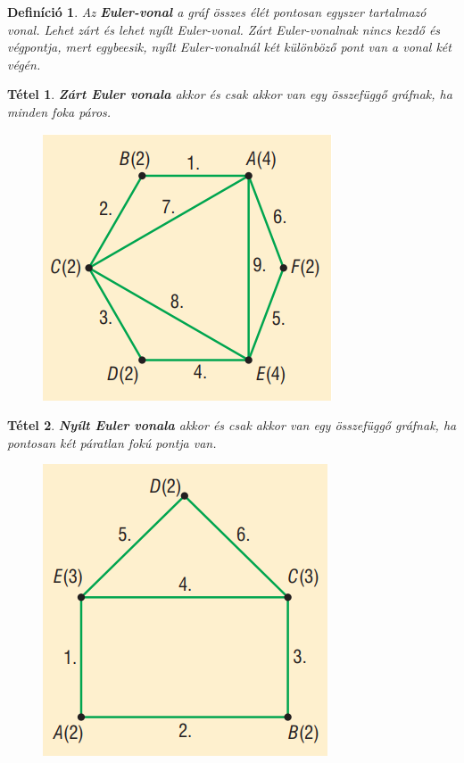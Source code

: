 \documentclass[12pt,a4paper]{article}
\newtheorem{theorem}{Tétel} [section]
\newtheorem{definition}{Definíció} [section]
\begin{document}
\begin{definition}
Az \textbf{Euler-vonal} a gráf összes élét pontosan egyszer tartalmazó vonal. Lehet zárt és lehet nyílt Euler-vonal. Zárt Euler-vonalnak nincs kezdő és végpontja, mert egybeesik, nyílt Euler-vonalnál két különböző pont van a vonal két végén.
\end{definition}

\begin{theorem}
\textbf{Zárt Euler vonala} akkor és csak akkor van egy összefüggő gráfnak, ha minden foka páros.
\begin{figure}[h]
\centering
\includegraphics[scale=0.3]{geometry/zart_Euler}
\end{figure}
\end{theorem}
\newpage
\begin{theorem}
\textbf{Nyílt Euler vonala} akkor és csak akkor van egy összefüggő gráfnak, ha pontosan két páratlan fokú pontja van.
\begin{figure}[h]
\centering
\includegraphics[scale=0.3]{geometry/nyilt_Euler}
\end{figure}
\end{theorem}
\end{document}
